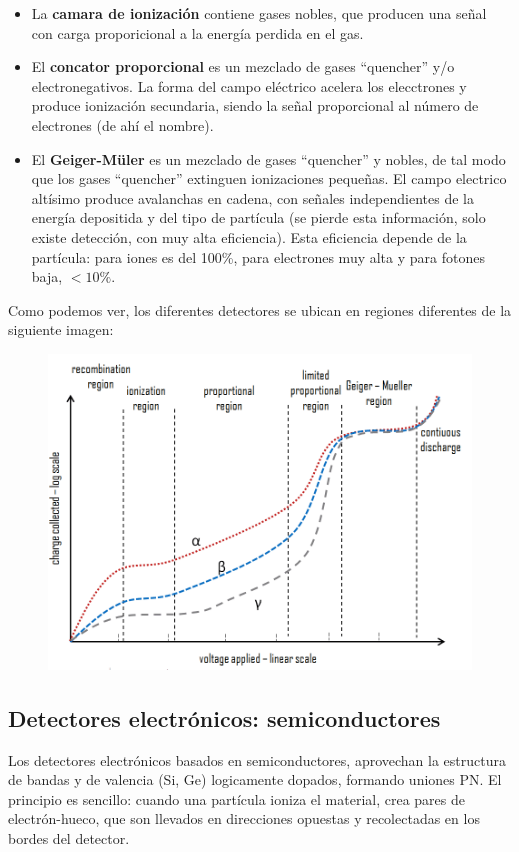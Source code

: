 \begin{itemize}
    \item La \textbf{camara de ionización} contiene gases nobles, que producen una señal con carga proporicional a la energía perdida en el gas. 
    \item El \textbf{concator proporcional} es un mezclado de gases ``quencher'' y/o electronegativos. La forma del campo eléctrico acelera los elecctrones y produce ionización secundaria, siendo la señal proporcional al número de electrones (de ahí el nombre). 
    \item El \textbf{Geiger-Müler} es un mezclado de gases ``quencher'' y nobles, de tal modo que los gases ``quencher'' extinguen ionizaciones pequeñas. El campo electrico altísimo produce avalanchas en cadena, con señales independientes de la energía depositida y del tipo de partícula (se pierde esta información, solo existe detección, con muy alta eficiencia). Esta eficiencia depende de la partícula: para iones es del 100\%, para electrones muy alta y para fotones baja, $<10\%$. 
\end{itemize}
Como podemos ver, los diferentes detectores se ubican en regiones  diferentes de la siguiente imagen: 

\begin{figure}[H] \centering
    \includegraphics[width=0.7\linewidth]{Cuerpo/Ch_01/Detectores_03.png}
\end{figure}


\subsection{Detectores electrónicos: semiconductores}

Los detectores electrónicos basados en semiconductores, aprovechan la estructura de bandas y de valencia (Si, Ge) logicamente dopados, formando uniones PN. El principio es sencillo: cuando una partícula ioniza el material, crea pares de electrón-hueco, que son llevados en direcciones opuestas y recolectadas en los bordes del detector. 

